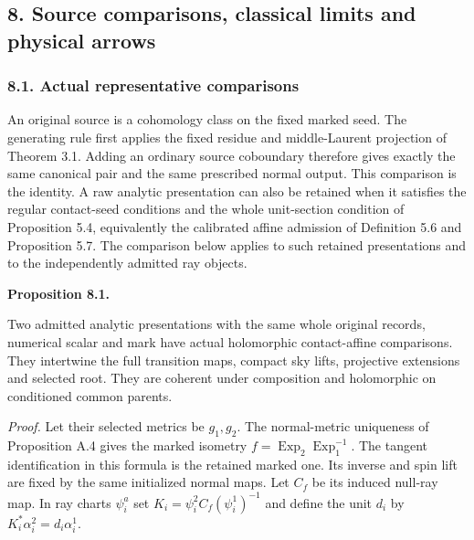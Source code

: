 \documentclass[
  english,
  11pt,
  reqno]{amsart}
\makeatletter
\newcommand{\pandocstatementheading}[1]{%
  \par\addpenalty{\@beginparpenalty}%
  \addvspace{.5\baselineskip plus .2\baselineskip minus .2\baselineskip}%
  {\normalfont\bfseries #1\par}%
  \nobreak\@afterindenttrue\@afterheading
}
\makeatother
\begin{document}
\protect{}\label{sec:gg-source-arrows-reality}

\subsection{8. Source comparisons, classical limits and physical
arrows}\label{source-comparisons-classical-limits-and-physical-arrows}

\protect{}\label{sec:gg-actual-source-comparisons}

\subsubsection{8.1. Actual representative
comparisons}\label{actual-representative-comparisons}

An original source is a cohomology class on the fixed marked seed. The
generating rule first applies the fixed residue and middle-Laurent
projection of Theorem 3.1. Adding an ordinary source coboundary
therefore gives exactly the same canonical pair and the same prescribed
normal output. This comparison is the identity. A raw analytic
presentation can also be retained when it satisfies the regular
contact-seed conditions and the whole unit-section condition of
Proposition 5.4, equivalently the calibrated affine admission of
Definition 5.6 and Proposition 5.7. The comparison below applies to such
retained presentations and to the independently admitted ray objects.

\pandocstatementheading{\protect{}\label{prop:gg-actual-affine-source-comparisons}Proposition 8.1.}

Two admitted analytic presentations with the same whole original
records, numerical scalar and mark have actual holomorphic
contact-affine comparisons. They intertwine the full transition maps,
compact sky lifts, projective extensions and selected root. They are
coherent under composition and holomorphic on conditioned common
parents.

\emph{Proof.} Let their selected metrics be \(g_1,g_2\). The
normal-metric uniqueness of Proposition A.4 gives the marked isometry
\(f=\operatorname{Exp}_{2}\operatorname{Exp}_{1}^{-1}\). The tangent
identification in this formula is the retained marked one. Its inverse
and spin lift are fixed by the same initialized normal maps. Let \(C_f\)
be its induced null-ray map. In ray charts \(\psi_i^a\) set
\(K_i=\psi_i^2C_f(\psi_i^1)^{-1}\) and define the unit \(d_i\) by
\(K_i^*\alpha_i^2=d_i\alpha_i^1\).
\end{document}
